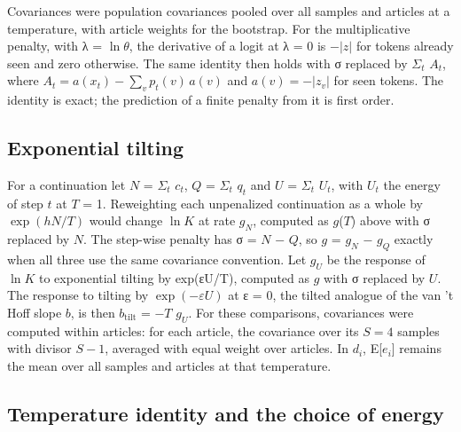 \documentclass[aps,prx,onecolumn,superscriptaddress,longbibliography]{revtex4-2}
\begin{document}
Covariances were population covariances pooled over all samples and articles at a temperature, with article weights for the bootstrap. For the multiplicative penalty, with λ = \(\ln \theta\), the derivative of a logit at λ = 0 is \(-|z|\) for tokens already seen and zero otherwise. The same identity then holds with σ replaced by \(\Sigma_{t}\) \(A_{t}\), where \(A_t=a(x_t)-\sum_v p_t(v)\,a(v)\) and \(a(v)=-|z_v|\) for seen tokens. The identity is exact; the prediction of a finite penalty from it is first order.

\subsection{Exponential tilting}

For a continuation let \(N\) = \(\Sigma_{t}\) \(c_{t}\), \(Q\) = \(\Sigma_{t}\) \(q_{t}\) and \(U\) = \(\Sigma_{t}\) \(U_{t}\), with \(U_{t}\) the energy of step \(t\) at \(T\) = 1. Reweighting each unpenalized continuation as a whole by \(\exp(hN/T)\) would change \(\ln K\) at rate \(g_{N}\), computed as \(g\)(\(T\)) above with σ replaced by \(N\). The step-wise penalty has σ = \(N\) − \(Q\), so \(g\) = \(g_{N}\) − \(g_{Q}\) exactly when all three use the same covariance convention. Let \(g_{U}\) be the response of \(\ln K\) to exponential tilting by exp(εU/T), computed as \(g\) with σ replaced by \(U\). The response to tilting by \(\exp(-\varepsilon U)\) at ε = 0, the tilted analogue of the van 't Hoff slope \(b\), is then \(b_{\mathrm{tilt}}\) = −\(T\) \(g_{U}\). For these comparisons, covariances were computed within articles: for each article, the covariance over its \(S=4\) samples with divisor \(S-1\), averaged with equal weight over articles. In \(d_{i}\), E{[}\(e_{i}\){]} remains the mean over all samples and articles at that temperature.

\subsection{Temperature identity and the choice of energy}
\end{document}
